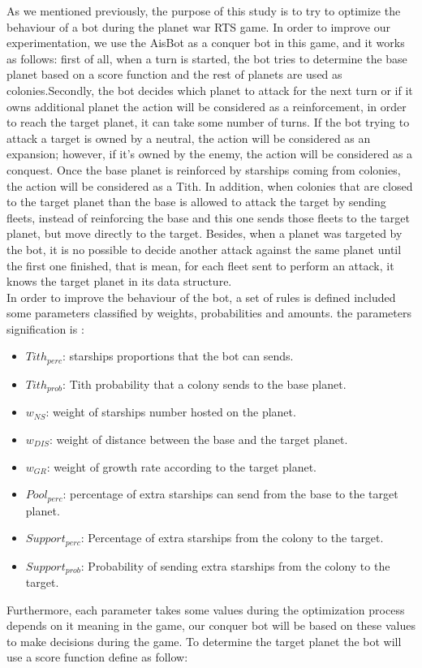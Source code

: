 \documentclass[]{interact}
\theoremstyle{plain}%
\theoremstyle{definition}
\theoremstyle{remark}
\begin{document}


As we mentioned previously, the purpose of this study is to try to optimize the behaviour of a bot during the planet war RTS game. In order to improve our experimentation, we use the AisBot as a conquer bot in this game, and it works as follows: first of all, when a turn is started, the bot tries to determine the base planet based on a score function and the rest of planets are used as colonies.Secondly, the bot decides which planet to attack for the next turn or if it owns additional planet the action will be considered as a reinforcement, in order to reach the target planet, it can take some number of turns. If the bot trying to attack a target is owned by a neutral, the action will be considered as an expansion; however, if it's owned by the enemy, the action will be considered as a conquest. Once the base planet is reinforced by starships coming from colonies, the action will be considered as a Tith. In addition, when colonies that are closed to the target planet than the base is allowed to attack the target by sending fleets, instead of reinforcing the base and this one sends those fleets to the target planet, but move directly to the target. Besides, when a planet was targeted by the bot, it is no possible to decide another attack against the same planet until the first one finished, that is mean, for each fleet sent to perform an attack, it knows the target planet in its data structure. \\

In order to improve the behaviour of the bot,  a set of rules is defined included some parameters classified by weights, probabilities and amounts. the parameters signification is : 
\begin{itemize}
\item \textit{$Tith_{perc}$}: starships proportions that the bot can sends.
\item \textit{$Tith_{prob}$}: Tith probability that a colony sends to the base planet.
\item \textit{$w_{NS}$}: weight of starships number hosted on the planet.
\item \textit{$w_{DIS}$}: weight of distance between the base and the target planet.
\item \textit{$w_{GR}$}: weight of growth rate according to the target planet.
\item \textit{$Pool_{perc}$}: percentage of extra starships can send from the base to the target planet.
\item \textit{$Support_{perc}$}: Percentage of extra starships from the colony to the target.
\item \textit{$Support_{prob}$}: Probability of sending extra starships from the colony to the target.
\end{itemize}
Furthermore, each parameter takes some values during the optimization process depends on it meaning in the game, our conquer bot will be based on these values to make decisions during the game. To determine the target planet the bot will use a score function define as follow:
\end{document}
